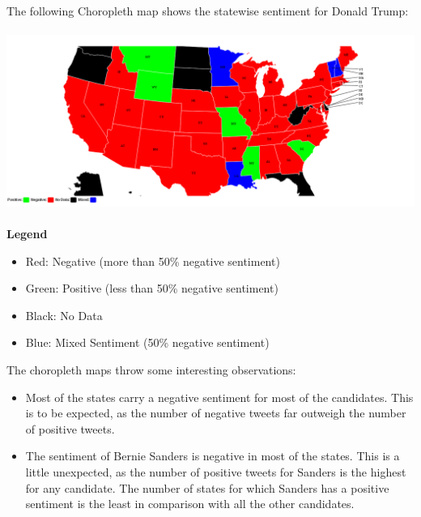 \documentclass[twoside]{article}
\begin{document}
\begin{multicols}{2}
The following Choropleth map shows the statewise sentiment for Donald Trump: \\ \\
\includegraphics[width=1\columnwidth]{trump-chor} \\ \\

\textbf{Legend}
\begin{itemize}
\item Red: Negative (more than 50\% negative sentiment)
\item Green: Positive (less than 50\% negative sentiment)
\item Black: No Data
\item Blue: Mixed Sentiment (50\% negative sentiment)
\end{itemize}

The choropleth maps throw some interesting observations: \\
\begin{itemize}
\item
Most of the states carry a negative sentiment for most of the candidates. This is to be expected, as the number of negative tweets far outweigh the number of positive tweets.
\item
The sentiment of Bernie Sanders is negative in most of the states. This is a little unexpected, as the number of positive tweets for Sanders is the highest for any candidate. The number of states for which Sanders has a positive sentiment is the least in comparison with all the other candidates.
\end{itemize}



\end{multicols}
\end{document}
